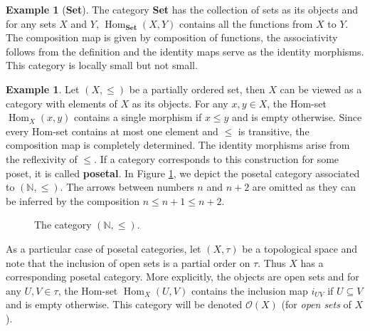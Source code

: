 \documentclass{article}
\theoremstyle{definition}
\newtheorem{exmp}[thm]{Example}
\theoremstyle{remark}
\newcommand{\N}{\mathbb{N}}
\DeclareMathOperator{\Hom}{Hom}
\begin{document}
\begin{exmp}[\textbf{\textbf{Set}}]
	The category \textbf{Set} has the collection of sets as its objects and for any sets $X$ and $Y$, $\Hom_{\textbf{Set}}(X,Y)$ contains all the functions from $X$ to $Y$. The composition map is given by composition of functions, the associativity follows from the definition and the identity maps serve as the identity morphisms. This category is locally small but not small.
\end{exmp}
\begin{exmp}
	Let $(X, \leq)$ be a partially ordered set, then $X$ can be viewed as a category with elements of $X$ as its objects. For any $x,y \in X$, the Hom-set $\Hom_X(x,y)$ contains a single morphism if $x \leq y$ and is empty otherwise. Since every Hom-set contains at most one element and $\leq$ is transitive, the composition map is completely determined. The identity morphisms arise from the reflexivity of $\leq$. If a category corresponds to this construction for some poset, it is called \textbf{posetal}. In Figure \ref{exmp-natposet}, we depict the posetal category associated to $(\N, \leq)$. The arrows between numbers $n$ and $n+2$ are omitted as they can be inferred by the composition $n \leq n+1 \leq n+2$.
	\begin{figure}[h]
		\centering
		\caption{The category $(\N, \leq)$.}
		\label{exmp-natposet}
	\end{figure}
	
	As a particular case of posetal categories, let $(X, \tau)$ be a topological space and note that the inclusion of open sets is a partial order on $\tau$. Thus $X$ has a corresponding posetal category. More explicitly, the objects are open sets and for any $U, V \in \tau$, the Hom-set $\Hom_X(U,V)$ contains the inclusion map $i_{UV}$ if $U\subseteq V$ and is empty otherwise. This category will be denoted $\mathcal{O}(X)$ (for \textit{open sets} of $X$).
\end{exmp}
\end{document}
